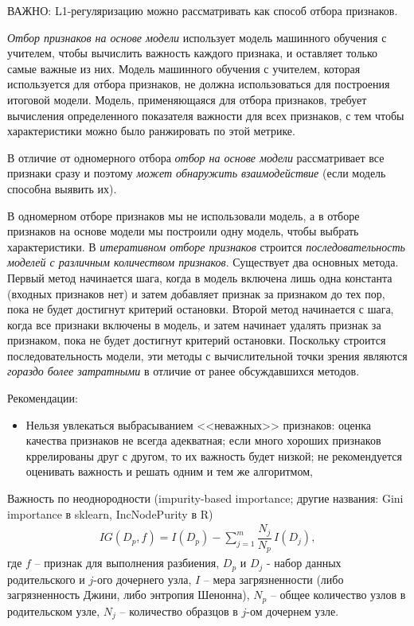 \documentclass[%
	11pt,
	a4paper,
	utf8,
		]{article}
\begin{document}
ВАЖНО: L1-регуляризацию можно рассматривать как способ отбора признаков.

\emph{Отбор признаков на основе модели} использует модель машинного обучения с учителем, чтобы вычислить важность каждого признака, и оставляет только самые важные из них. Модель машинного обучения с учителем, которая используется для отбора признаков, не должна использоваться для построения итоговой модели. Модель, применяющаяся для отбора признаков, требует вычисления определенного показателя важности для всех признаков, с тем чтобы характеристики можно было ранжировать по этой метрике.

В отличие от одномерного отбора \emph{отбор на основе модели} рассматривает все признаки сразу и поэтому \emph{может обнаружить взаимодействие} (если модель способна выявить их).

В одномерном отборе признаков мы не использовали модель, а в отборе признаков на основе модели мы построили одну модель, чтобы выбрать характеристики. В \emph{итеративном отборе признаков} строится \emph{последовательность моделей с различным количеством признаков}. Существует два основных метода. Первый метод начинается шага, когда в модель включена лишь одна константа (входных признаков нет) и затем добавляет признак за признаком до тех пор, пока не будет достигнут критерий остановки. Второй метод начинается с шага, когда все признаки включены в модель, и затем начинает удалять признак за признаком, пока не будет достигнут критерий остановки. Поскольку строится последовательность модели, эти методы с вычислительной точки зрения являются \emph{гораздо более затратными} в отличие от ранее обсуждавшихся методов.

Рекомендации:
\begin{itemize}
	\item Нельзя увлекаться выбрасыванием <<неважных>> признаков: оценка качества признаков не всегда адекватная; если много хороших признаков кррелированы друг с другом, то их важность будет низкой; не рекомендуется оценивать важность и решать одним и тем же алгоритмом,
	
	
\end{itemize}


Важность по неоднородности (impurity-based importance; другие названия: Gini importance в sklearn, IncNodePurity в R) \cite[122]{raschka:2019}
\begin{align*}
	IG(D_p, f) = I(D_p) - \sum_{j = 1}^{m} \dfrac{N_j}{N_p}\,I(D_j),
\end{align*}
где $ f $ -- признак для выполнения разбиения, $ D_p $ и $ D_j $ - набор данных родительского и $ j $-ого дочернего узла, $ I $ -- мера загрязненности (либо загрязненность Джини, либо энтропия Шенонна), $ N_p $ -- общее количество узлов в родительском узле, $ N_j $ -- количество образцов в $ j $-ом дочернем узле.
\end{document}
